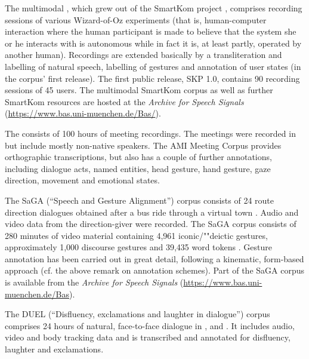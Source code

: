 \documentclass[output=paper
 	        ,biblatex
                ,babelshorthands
                ,newtxmath
                ,draftmode
                ,colorlinks, citecolor=brown
]{langscibook}
\begin{document}
The multimodal  \citep{Schiel:Steininger:Tuerk:2003}, which grew out of the SmartKom project \citep{Wahlster:2006}, comprises recording sessions of various Wizard-of-Oz experiments (that is, human-computer interaction where the human participant is made to believe that the system she or he interacts with is autonomous while in fact it is, at least partly, operated by another human).
%
Recordings are extended basically by a transliteration and labelling of natural speech, labelling of gestures and annotation of user states (in the corpus' first release). 
%
The first public release, SKP 1.0, contains 90 recording sessions of 45 users. 
%
The multimodal SmartKom corpus as well as further SmartKom resources are hosted at the \textit{ Archive for Speech Signals} (\url{https://www.bas.uni-muenchen.de/Bas/}).


The  \citep{Carletta:et:al:2006} consists of 100 hours of meeting recordings.
%
The meetings were recorded in  but include mostly non-native speakers. 
%
The AMI Meeting Corpus provides orthographic transcriptions, but also has a couple of further annotations, including dialogue acts, named entities, head gesture, hand gesture, gaze direction, movement and emotional states.


The SaGA (\enquote{Speech and Gesture Alignment}) corpus consists of 24  route direction dialogues obtained after a bus ride through a virtual town \citep{Luecking:Bergmann:Hahn:Kopp:Rieser:2010}. 
%
Audio and video data from the direction-giver were recorded. 
%
The SaGA corpus consists of 280 minutes of video material containing 4,961 iconic/""deictic gestures, approximately 1,000 discourse gestures and 39,435 word tokens \citep{Luecking:Bergmann:Hahn:Kopp:Rieser:2013}.
%
Gesture annotation has been carried out in great detail, following a kinematic, form-based approach (cf. the above remark on annotation schemes).
%
Part of the SaGA corpus is available from the \textit{ Archive for Speech Signals} (\url{https://www.bas.uni-muenchen.de/Bas}).


The DUEL (\enquote{Disfluency, exclamations and laughter in dialogue}) corpus \citep{Hough:Tian:de:Ruiter:Betz:Kousidis:Schlangen:Ginzburg:2016} comprises 24 hours of natural, face-to-face dialogue in ,  and .
%
It includes audio, video and body tracking data and is transcribed and annotated for disfluency, laughter and exclamations.
\end{document}
